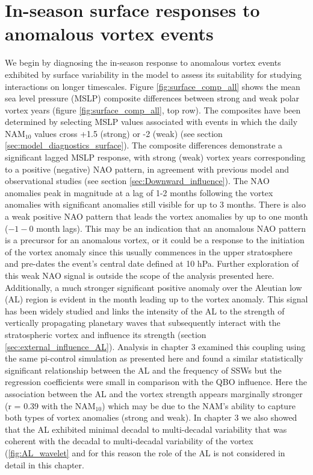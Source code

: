 \section{In-season surface responses to anomalous vortex events}
We begin by diagnosing the in-season response to anomalous vortex events exhibited by surface variability in the model to assess its suitability for studying interactions on longer timescales. Figure \ref{fig:surface_comp_all} shows the mean sea level pressure (MSLP) composite differences between strong and weak polar vortex years (figure \ref{fig:surface_comp_all}, top row). The composites have been determined by selecting MSLP values associated with events in which the daily NAM$_{10}$ values cross +1.5 (strong) or -2 (weak) (see section \ref{sec:model_diagnostics_surface}). The composite differences demonstrate a significant lagged MSLP response, with strong (weak) vortex years  corresponding to a positive (negative) NAO pattern, in agreement with previous model and observational studies (see section \ref{sec:Downward_influence}). The NAO anomalies peak in magnitude at a lag of 1-2 months following the vortex anomalies with significant anomalies still visible for up to 3 months. There is also a weak positive NAO pattern that leads the vortex anomalies by up to one month ($-1 - 0$ month lags). This may be an indication that an anomalous NAO pattern is a precursor for an anomalous vortex, or it could be a response to the initiation of the vortex anomaly since this usually commences in the upper stratosphere and pre-dates the event's central date defined at 10 hPa. Further exploration of this weak NAO signal is outside the scope of the analysis presented here. Additionally, a much stronger significant positive anomaly over the Aleutian low (AL) region is evident in the month leading up to the vortex anomaly. This signal has been widely studied \citep{raoModulation2019a} and links the intensity of the AL to the strength of vertically propagating planetary waves that subsequently interact with the stratospheric vortex and influence its strength (section \ref{sec:external_influence_AL}). Analysis in chapter 3 examined this coupling using the same pi-control simulation as presented here and found a similar statistically significant relationship between the AL and the frequency of SSWs but the regression coefficients were small in comparison with the QBO influence. Here the association between the AL and the vortex strength appears marginally stronger (r = 0.39 with the NAM$_{10}$) which may be due to the NAM's ability to capture both types of vortex anomalies (strong and weak). In chapter 3 we also showed that the AL exhibited minimal decadal to multi-decadal variability that was coherent with the decadal to multi-decadal variability of the vortex (\ref{fig:AL_wavelet} and for this reason the role of the AL is not considered in detail in this chapter.

